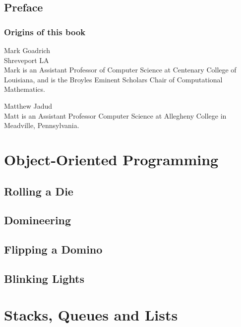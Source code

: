 \documentclass[10pt]{book}
\begin{document}
\chapter{Preface}

\section*{Origins of this book}

Mark Goadrich\\
Shreveport LA\\

Mark is an Assistant Professor of Computer Science
at Centenary College of Louisiana, and is the 
Broyles Eminent Scholars Chair of Computational Mathematics.

Matthew Jadud\\
Matt is an Assistant Professor Computer Science
at Allegheny College in Meadville, Pennsylvania.

\normalsize

\clearemptydoublepage

\begin{latexonly}

\tableofcontents

\clearemptydoublepage

\end{latexonly}

\mainmatter

\part{Object-Oriented Programming}

\chapter{Rolling a Die}



\chapter{Domineering}

\chapter{Flipping a Domino}

\chapter{Blinking Lights}

\part{Stacks, Queues and Lists}
\end{document}
